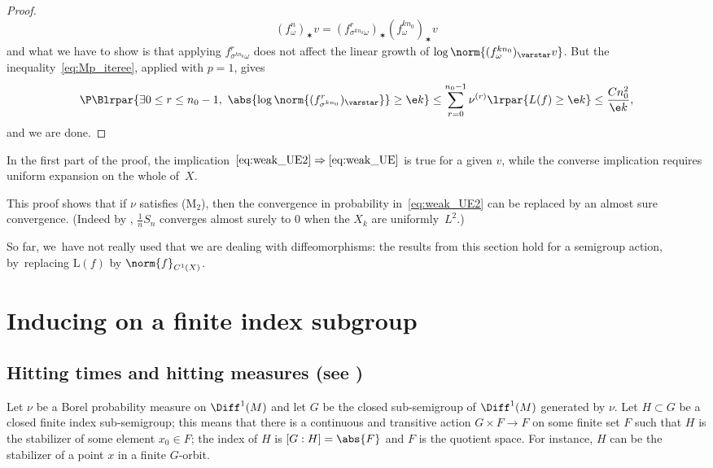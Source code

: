 \begin{proof}
\begin{equation*}\label{eq:differential}
{(f^{n }_\omega)_\varstar v} = (f^{r}_{\sigma^{kn_0} \omega})_\varstar
(f^{kn_0}_\omega)_\varstar v
\end{equation*}
and what we have to show is that applying $f^{r}_{\sigma^{kn_0} \omega}$
does not affect
the linear growth of $ \log\norm{ (f^{kn_0}_\omega)_\varstar v }$.
But the inequality~\eqref{eq:Mp_iteree}, applied with $p=1$, gives
\begin{equation*}
\P \Blrpar{\exists 0\leq r\leq n_0-1, \ \abs{\log\norm{ ( f^{r}_{\sigma^{kn_0}})_\varstar }}\geq \e k}
\leq \sum_{r=0}^{n_0-1}
\nu^{(r)}\lrpar{ L(f) \geq \e k}
\leq \frac{Cn_0^2}{\e k} ,
\end{equation*}
and we are done.
\end{proof}

\begin{rem} \label{rem:given_v} In the first part of the proof,
the implication~$\eqref{eq:weak_UE2}\Rightarrow\eqref{eq:weak_UE}$ is true for a given $v$, while the converse implication requires uniform expansion on the whole of~$X$.
\end{rem}

\begin{rem}
This proof shows that if $\nu$ satisfies (M$_2$), then the convergence in probability in~\eqref{eq:weak_UE2} can be replaced by an almost sure convergence. (Indeed by \cite[Th.\,3, p.\,243]{Feller:vol2},
$\frac{1}{n}S_n$ converges almost surely to $0$ when the $X_k$ are uniformly~$L^2$.)
\end{rem}

\begin{rem}
So far, we~have not really used that we are dealing with diffeomorphisms: the results from this section
hold for a semigroup action, by~replacing $\mathrm L(f)$ by $\norm{f}_{C^1(X)}$.
\end{rem}

\section{Inducing on a finite index subgroup} \label{sec:inducing}

\subsection{Hitting times and hitting measures (see \cite[Chap.\,5]{benoist-quint_book}) }\label{par:hitting_measure}

Let $\nu$ be a Borel
probability measure on $\Diff^1(M)$ and let $G$ be the
closed sub-semigroup of $\Diff^1(M)$ generated by $\nu$.
Let $H\subset G$ be a closed finite index
sub-semigroup; this means that
there is a continuous and transitive action $G\times F \to F$ on some finite set $F$ such that $H$ is the stabilizer of some element $x_0\in F$; the index of
$H$ is $[G:H]=\abs{F}$ and $F$ is the quotient space.
For instance, $H$ can be the stabilizer of a point $x$ in a finite $G$-orbit.

